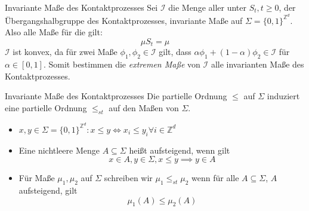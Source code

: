 \documentclass[11pt]{beamer}
\begin{document}
\begin{frame}{Invariante Maße des Kontaktprozesses}
    Sei $\mathcal{I}$ die Menge aller unter $S_t, t \geq 0$, der Übergangshalbgruppe  
    des Kontaktprozesses, invariante Maße auf $\Sigma = \{ 0, 1 \}^{\mathbb{Z}^d}$.
    Also alle Maße für die gilt:
    \begin{equation*}
        \mu S_t = \mu
    \end{equation*}
    $\mathcal{I}$ ist konvex, da für zwei Maße $\phi_1, \phi_2 \in \mathcal{I}$
    gilt, dass $\alpha \phi_1 + ( 1 - \alpha) \phi_2 \in \mathcal{I}$ für $\alpha \in [0, 1]$.
    Somit bestimmen die \textit{extremen Maße} von $\mathcal{I}$ alle invarianten Maße des Kontaktprozesses.
\end{frame}

\begin{frame}{Invariante Maße des Kontaktprozesses}
    Die partielle Ordnung $\leq$ auf $\Sigma$ induziert eine partielle Ordnung $\leq_{st}$ auf den Maßen von
    $\Sigma$.
    \begin{itemize}
        \item<2-> $x, y \in \Sigma = \{0, 1\}^{\mathbb{Z}^d}: x \leq y \iff x_i \leq y_i \forall i \in \mathbb{Z}^d$
        \item<3-> Eine nichtleere Menge $A \subseteq \Sigma$ heißt aufsteigend, wenn gilt
        \begin{equation*}
            x \in A, y \in \Sigma, x \leq y \implies y \in A
        \end{equation*}
        \item<3-> Für Maße $\mu_1, \mu_2$ auf $\Sigma$ schreiben wir $\mu_1 \leq_{st} \mu_2$ wenn
        für alle $A \subseteq \Sigma$, $A$ aufsteigend, gilt
        \begin{equation*}
            \mu_1(A) \leq \mu_2(A)
        \end{equation*}
    \end{itemize}
\end{frame}
\end{document}

